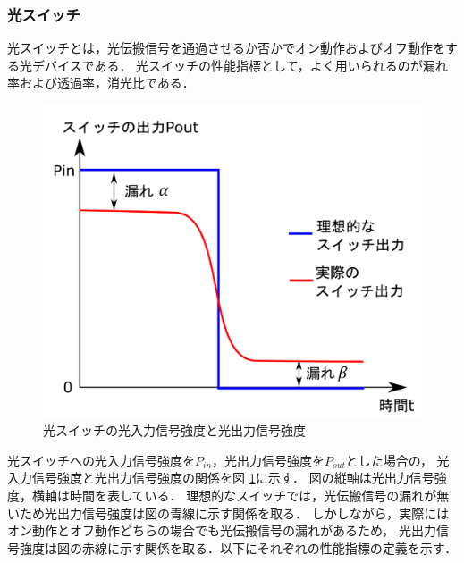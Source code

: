 \subsubsection{光スイッチ}
光スイッチとは，光伝搬信号を通過させるか否かでオン動作およびオフ動作をする光デバイスである．
光スイッチの性能指標として，よく用いられるのが漏れ率および透過率，消光比である．
\begin{figure}[t!]
\begin{center}
\includegraphics[keepaspectratio,scale=0.25]{fig/3/swichout.pdf}
\caption{光スイッチの光入力信号強度と光出力信号強度}
\label{fig:swichout}
\end{center}
\end{figure}
光スイッチへの光入力信号強度を$P_{in}$，光出力信号強度を$P_{out}$とした場合の，
光入力信号強度と光出力信号強度の関係を図 \ref{fig:swichout}に示す．
図の縦軸は光出力信号強度，横軸は時間を表している．
理想的なスイッチでは，光伝搬信号の漏れが無いため光出力信号強度は図の青線に示す関係を取る．
しかしながら，実際にはオン動作とオフ動作どちらの場合でも光伝搬信号の漏れがあるため，
光出力信号強度は図の赤線に示す関係を取る．以下にそれぞれの性能指標の定義を示す．
